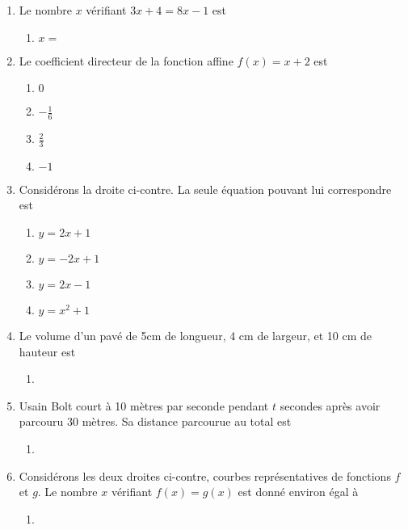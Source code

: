 
\begin{enumerate}[label=\textbf{\arabic*.}]
	\item 
	Le nombre $x$ vérifiant $3x + 4 = 8x - 1$ est
	\begin{multicols}{4}
	\begin{enumerate}[label=\textbf{\alph*)}]
		\item $x = $
	\end{enumerate}
	\end{multicols}
	
	\item 
	Le coefficient directeur de la fonction affine $f(x) = x + 2$ est
	\begin{multicols}{4}
	\begin{enumerate}[label=\textbf{\alph*)}]
		\item $0$
		\item $-\frac16$
		\item $\frac23$
		\item $-1$
	\end{enumerate}
	\end{multicols}
	
	\item 
	Considérons la droite ci-contre.
	La seule équation pouvant lui correspondre est
	\begin{multicols}{2}
	\begin{enumerate}[label=\textbf{\alph*)}]
		\item $y=2x+1$
		\item $y=-2x+1$
		\item $y=2x-1$
		\item $y=x^2+1$
	\end{enumerate}
	\end{multicols}
	
	\item 
	Le volume d'un pavé de 5cm de longueur, 4 cm de largeur, et 10 cm de hauteur est
	\begin{multicols}{4}
	\begin{enumerate}[label=\textbf{\alph*)}]
		\item
	\end{enumerate}
	\end{multicols}
	
	\item 
	Usain Bolt court à 10 mètres par seconde pendant $t$ secondes après avoir parcouru 30 mètres.
	Sa distance parcourue au total est
	\begin{multicols}{4}
	\begin{enumerate}[label=\textbf{\alph*)}]
		\item
	\end{enumerate}
	\end{multicols}
	
	\item 
	Considérons les deux droites ci-contre, courbes représentatives de fonctions $f$ et $g$.
	Le nombre $x$ vérifiant $f(x) = g(x)$ est donné environ égal à
	\begin{multicols}{4}
	\begin{enumerate}[label=\textbf{\alph*)}]
		\item
	\end{enumerate}
	\end{multicols}
\end{enumerate}

